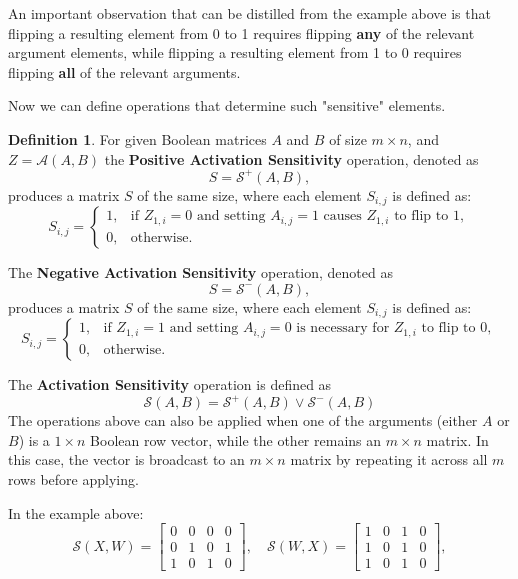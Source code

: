 \documentclass{article}
\theoremstyle{definition}
\newtheorem*{definition}{Definition}
\theoremstyle{remark}
\begin{document}
An important observation that can be distilled from the example above is that flipping a resulting element from 0 to 1 requires flipping \textbf{any} of the relevant argument elements, while flipping a resulting element from 1 to 0 requires flipping \textbf{all} of the relevant arguments.

Now we can define operations that determine such "sensitive" elements.

\begin{definition}
    For given Boolean matrices \( A \) and \( B \) of size \( m \times n \), and \( Z = \mathcal{A}(A, B) \) the \textbf{Positive Activation Sensitivity} operation, denoted as
    \[
        S = \mathcal{S}^+(A, B),
    \]
    produces a matrix \( S \) of the same size, where each element \( S_{i,j} \) is defined as:
    \[
        S_{i,j} =
        \begin{cases}
            1, & \text{if } Z_{1,i} = 0 \text{ and setting } A_{i,j} = 1 \text{ causes } Z_{1,i} \text{ to flip to } 1, \\
            0, & \text{otherwise}.
        \end{cases}
    \]

    The \textbf{Negative Activation Sensitivity} operation, denoted as
    \[
        S = \mathcal{S}^-(A, B),
    \]
    produces a matrix \( S \) of the same size, where each element \( S_{i,j} \) is defined as:
    \[
        S_{i,j} =
        \begin{cases}
            1, & \text{if } Z_{1,i} = 1 \text{ and setting } A_{i,j} = 0 \text{ is necessary for } Z_{1,i} \text{ to flip to }  0, \\
            0, & \text{otherwise}.
        \end{cases}
    \]

    The \textbf{Activation Sensitivity} operation is defined as
    \[
        \mathcal{S}(A, B) = \mathcal{S}^+(A, B) \vee \mathcal{S}^-(A, B)
    \]
    The operations above can also be applied when one of the arguments (either \( A \) or \( B \)) is a \( 1 \times n \) Boolean row vector, while the other remains an \( m \times n \) matrix. In this case, the vector is broadcast to an \( m \times n \) matrix by repeating it across all \( m \) rows before applying.
\end{definition}

In the example above:
\[
    \mathcal{S}(X, W) = \begin{bmatrix} 0 & 0 & 0 & 0 \\ 0 & 1 & 0 & 1 \\ 1 & 0 & 1 & 0 \end{bmatrix},\quad
    \mathcal{S}(W, X) = \begin{bmatrix} 1 & 0 & 1 & 0 \\ 1 & 0 & 1 & 0 \\ 1 & 0 & 1 & 0 \end{bmatrix},
\]
\end{document}
